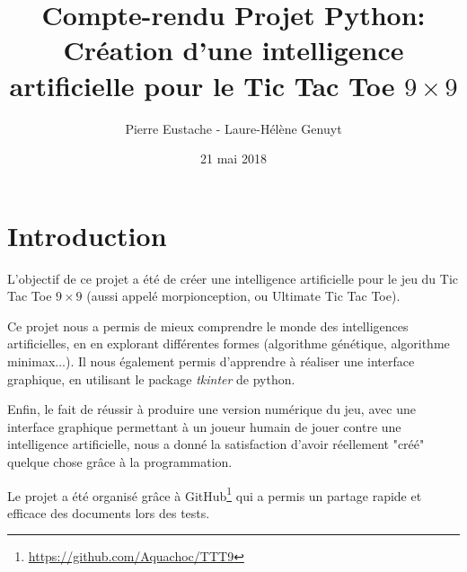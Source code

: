 \documentclass[10pt, french]{article}
\title{Compte-rendu Projet Python: \\ Création d'une intelligence artificielle pour le Tic Tac Toe $9\times9$ }
\author{Pierre Eustache - Laure-Hélène Genuyt }
\date{21 mai 2018}
\begin{document}
\maketitle
\tableofcontents



\paragraph{}
    
\section{Introduction}
\par L'objectif de ce projet a été de créer une intelligence artificielle pour le jeu du Tic Tac Toe $9\times9$ (aussi appelé morpionception, ou Ultimate Tic Tac Toe). \\
\par Ce projet nous a permis de mieux comprendre le monde des intelligences artificielles, en en explorant différentes formes (algorithme génétique, algorithme minimax...). 
Il nous également permis d'apprendre à réaliser une interface graphique, en utilisant le package \textit{tkinter} de python. \\
\par Enfin, le fait de réussir à produire une version numérique du jeu, avec une interface graphique permettant à un joueur humain de jouer contre une intelligence artificielle, nous a donné la satisfaction d'avoir réellement "créé" quelque chose grâce à la programmation. 
\par Le projet a été organisé grâce à GitHub\footnote{\url{https://github.com/Aquachoc/TTT9}} qui a permis un partage rapide et efficace des documents lors des tests.
\end{document}
